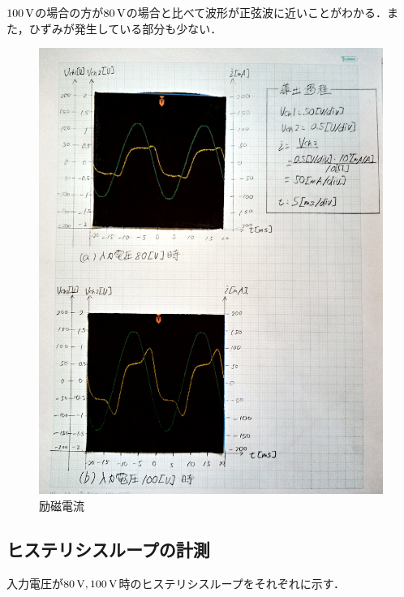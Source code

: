 $100\,\rm{V}$の場合の方が$80\,\rm{V}$の場合と比べて波形が正弦波に近いことがわかる．また，ひずみが発生している部分も少ない．
\begin{figure}[h]
	\centering
	\includegraphics[scale=0.8]{./data/graph/1.pdf}
	\caption{励磁電流}
	\label{fig:1}
\end{figure}

\subsection{ヒステリシスループの計測}
入力電圧が$80\,\rm{V}, 100\,\rm{V}$時のヒステリシスループをそれぞれに示す．

